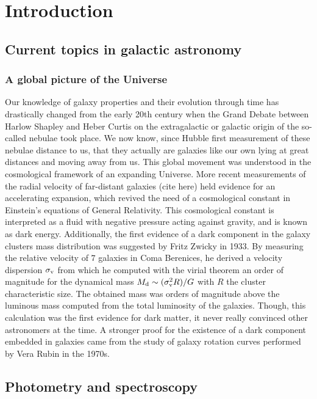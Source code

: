\clearpage
\section{Introduction}
\label{sec:Intro}

\subsection{Current topics in galactic astronomy}

\subsubsection{A global picture of the Universe}

Our knowledge of galaxy properties and their evolution through time has drastically changed from the early 20th century when the Grand Debate between Harlow Shapley and Heber Curtis on the extragalactic or galactic origin of the so-called nebulae took place. We now know, since Hubble first measurement of these nebulae distance to us, that they actually are galaxies like our own lying at great distances and moving away from us. This global movement was understood in the cosmological framework of an expanding Universe. More recent measurements of the radial velocity of far-distant galaxies (cite here) held evidence for an accelerating expansion, which revived the need of a cosmological constant in Einstein's equations of General Relativity. This cosmological constant is interpreted as a fluid with negative pressure acting against gravity, and is known as dark energy. Additionally, the first evidence of a dark component in the galaxy clusters mass distribution was suggested by Fritz Zwicky in 1933. By measuring the relative velocity of $7$ galaxies in Coma Berenices, he derived a velocity dispersion $\sigma_{\rm{v}}$ from which he computed with the virial theorem an order of magnitude for the dynamical mass $M_{\rm{d}} \sim (\sigma_{\rm{v}}^2 R ) / G$ with $R$ the cluster characteristic size. The obtained mass was orders of magnitude above the luminous mass computed from the total luminosity of the galaxies. Though, this calculation was the first evidence for dark matter, it never really convinced other astronomers at the time. A stronger proof for the existence of a dark component embedded in galaxies came from the study of galaxy rotation curves performed by Vera Rubin in the 1970s.


\subsection{Photometry and spectroscopy}
\label{subsec:diffPhotSpec}

